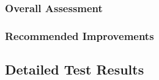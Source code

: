 \documentclass[DM,lsstdraft,STR,toc]{lsstdoc}
\begin{document}
\subsubsection{Overall Assessment}
\label{sect:overallassessment}


\subsubsection{Recommended Improvements}
\label{sect:recommendations}

\subsection{Detailed Test Results}
\label{sect:detailedtestresults}
\end{document}
